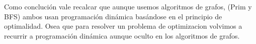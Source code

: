 Como conclución vale recalcar que aunque usemos algoritmos de grafos, (Prim y BFS) ambos usan programación dinámica basándose en el principio de optimalidad. Osea que para resolver un problema de optimizacion volvimos a recurrir a programación dinámica aunque oculto en los algoritmos de grafos.